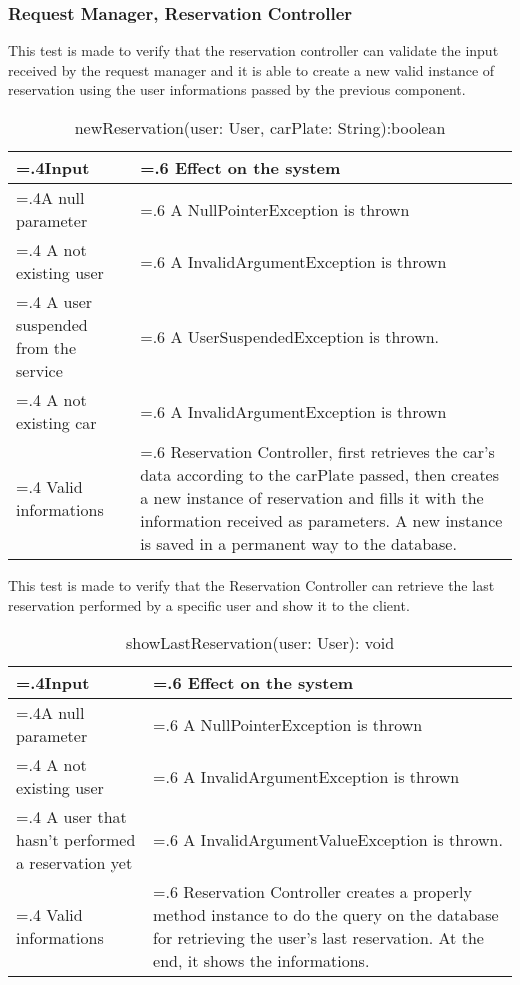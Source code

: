 \documentclass[10pt, a4paper,titlepage]{article}
\begin{document}
\subsubsection{Request Manager, Reservation Controller}
This test is made to verify that the reservation controller can validate the input received by the request manager and it is able to create a new valid instance of reservation using the user informations passed by the previous component.
\begin{table}[h]
\caption{newReservation(user: User, carPlate: String):boolean}
\begin{tabularx}{\textwidth}{|>{\hsize=.4\hsize}X|>{\hsize=.6\hsize}X|}
\hline
Input & Effect on the system\\
\hline
A null parameter & A NullPointerException is thrown\\ 
\hline
A not existing user & A InvalidArgumentException is thrown\\
\hline
A user suspended from the service & A UserSuspendedException is thrown. \\
\hline
A not existing car & A InvalidArgumentException is thrown\\
\hline
Valid informations & Reservation Controller, first retrieves the car’s data according to the carPlate passed, then creates a new instance of reservation and fills it with the information received as parameters. A new instance is saved in a permanent way to the database.\\
\hline
\end{tabularx}
\end{table}
\clearpage
This test is made to verify that the Reservation Controller can retrieve the last reservation performed by a specific user and show it to the client.
\begin{table}[h]
\caption{showLastReservation(user: User): void}
\begin{tabularx}{\textwidth}{|>{\hsize=.4\hsize}X|>{\hsize=.6\hsize}X|}
\hline
Input & Effect on the system\\
\hline
A null parameter & A NullPointerException is thrown\\ 
\hline
A not existing user & A InvalidArgumentException is thrown\\
\hline
A user that hasn’t performed a reservation yet & A InvalidArgumentValueException is thrown. \\
\hline
Valid informations & Reservation Controller creates a properly method instance to do the query on the database for retrieving the user’s last reservation. At the end, it shows the informations. \\
\hline
\end{tabularx}
\end{table}
\end{document}
